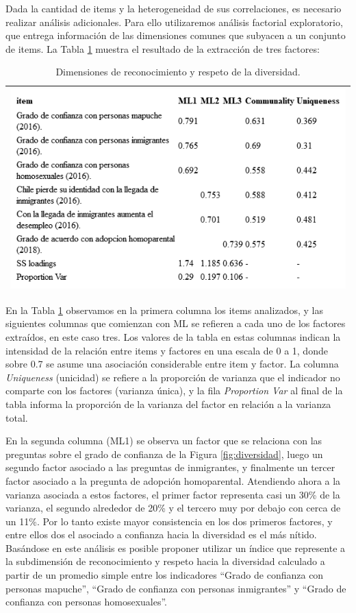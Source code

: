 \documentclass[
  12pt,
]{book}
\begin{document}
Dada la cantidad de items y la heterogeneidad de sus correlaciones, es necesario realizar análisis adicionales. Para ello utilizaremos análisis factorial exploratorio, que entrega información de las dimensiones comunes que subyacen a un conjunto de items. La Tabla \ref{tab:div-fa} muestra el resultado de la extracción de tres factores:

\begin{longtable}[]{@{}l@{}}
\caption{\label{tab:div-fa}Dimensiones de reconocimiento y respeto de la diversidad.}\tabularnewline
\toprule
\endhead
\includegraphics[width=8.33333in,height=\textheight]{output/tables/div_fa.png} \\
\bottomrule
\end{longtable}

En la Tabla \ref{tab:div-fa} observamos en la primera columna los items analizados, y las siguientes columnas que comienzan con ML se refieren a cada uno de los factores extraídos, en este caso tres. Los valores de la tabla en estas columnas indican la intensidad de la relación entre items y factores en una escala de 0 a 1, donde sobre 0.7 se asume una asociación considerable entre item y factor. La columna \emph{Uniqueness} (unicidad) se refiere a la proporción de varianza que el indicador no comparte con los factores (varianza única), y la fila \emph{Proportion Var} al final de la tabla informa la proporción de la varianza del factor en relación a la varianza total.

En la segunda columna (ML1) se observa un factor que se relaciona con las preguntas sobre el grado de confianza de la Figura \ref{fig:diversidad}, luego un segundo factor asociado a las preguntas de inmigrantes, y finalmente un tercer factor asociado a la pregunta de adopción homoparental. Atendiendo ahora a la varianza asociada a estos factores, el primer factor representa casi un 30\% de la varianza, el segundo alrededor de 20\% y el tercero muy por debajo con cerca de un 11\%. Por lo tanto existe mayor consistencia en los dos primeros factores, y entre ellos dos el asociado a confianza hacia la diversidad es el más nítido. Basándose en este análisis es posible proponer utilizar un índice que represente a la subdimensión de reconocimiento y respeto hacia la diversidad calculado a partir de un promedio simple entre los indicadores ``Grado de confianza con personas mapuche'', ``Grado de confianza con personas inmigrantes'' y ``Grado de confianza con personas homosexuales''.
\end{document}
